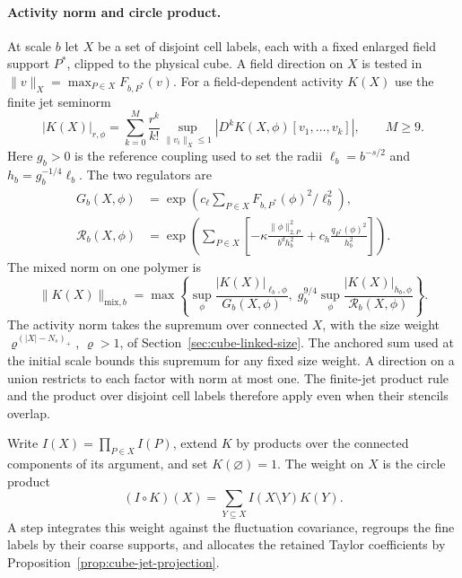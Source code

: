 \documentclass[11pt]{article}
\theoremstyle{definition}
\begin{document}
\paragraph{Activity norm and circle product.}
At scale \(b\) let \(X\) be a set of disjoint cell labels, each with a
fixed enlarged field support \(P^*\), clipped to the physical cube.
A field direction on \(X\) is tested in
\(\|v\|_X=\max_{P\in X}F_{b,P^*}(v)\).
For a field-dependent activity \(K(X)\) use the finite jet seminorm
\begin{equation}
 |K(X)|_{r,\phi}
 =\sum_{k=0}^{M}\frac{r^k}{k!}
   \sup_{\|v_i\|_X\le1}
   |D^k K(X,\phi)[v_1,\ldots,v_k]|,\qquad M\ge9 .
\end{equation}
Here \(g_b>0\) is the reference coupling used to set the radii
\(\ell_b=b^{-s/2}\) and \(h_b=g_b^{-1/4}\ell_b\). The two regulators are
\begin{equation}
 \begin{aligned}
 G_b(X,\phi)&=\exp\!\left(c_\ell\sum_{P\in X}
           F_{b,P^*}(\phi)^2/\ell_b^2\right),\\
 \mathcal R_b(X,\phi)&=\exp\!\left(\sum_{P\in X}
     \left[-\kappa\frac{\|\phi\|_{2,P}^2}{b^d h_b^2}
           +c_h\frac{q_{P^*}(\phi)^2}{h_b^2}\right]\right).
 \end{aligned}
\end{equation}
The mixed norm on one polymer is
\begin{equation}
 \|K(X)\|_{\mathrm{mix},b}
 =\max\left\{\sup_\phi\frac{|K(X)|_{\ell_b,\phi}}{G_b(X,\phi)},
       \;g_b^{9/4}\sup_\phi\frac{|K(X)|_{h_b,\phi}}{\mathcal R_b(X,\phi)}\right\}.
\end{equation}
The activity norm takes the supremum over connected \(X\), with the
size weight \(\varrho^{(|X|-N_s)_+}\), \(\varrho>1\), of
Section~\ref{sec:cube-linked-size}. The anchored sum used at the
initial scale bounds this supremum for any fixed size weight.
A direction on a union restricts to each factor with norm at most
one. The finite-jet product rule and the product over disjoint
cell labels therefore apply even when their stencils overlap.

Write \(I(X)=\prod_{P\in X}I(P)\), extend \(K\) by products over the
connected components of its argument, and set \(K(\varnothing)=1\).
The weight on \(X\) is the circle product
\begin{equation}
 (I\circ K)(X)=\sum_{Y\subseteq X}I(X\setminus Y)K(Y).
\end{equation}
A step integrates this weight against the fluctuation covariance,
regroups the fine labels by their coarse supports, and allocates the
retained Taylor coefficients by Proposition~\ref{prop:cube-jet-projection}.
\end{document}

